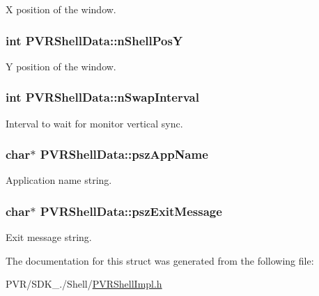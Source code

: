 X position of the window. \hypertarget{struct_p_v_r_shell_data_af3e9b9c86bef2d83b1c3b4edfacbb7f9}{
\subsubsection[{n\+Shell\+Pos\+Y}]{\setlength{\rightskip}{0pt plus 5cm}int P\+V\+R\+Shell\+Data\+::n\+Shell\+Pos\+Y}}\label{struct_p_v_r_shell_data_af3e9b9c86bef2d83b1c3b4edfacbb7f9}
Y position of the window. \hypertarget{struct_p_v_r_shell_data_a9584c6b96d5a88d83e1055f9f09d2f3f}{
\subsubsection[{n\+Swap\+Interval}]{\setlength{\rightskip}{0pt plus 5cm}int P\+V\+R\+Shell\+Data\+::n\+Swap\+Interval}}\label{struct_p_v_r_shell_data_a9584c6b96d5a88d83e1055f9f09d2f3f}
Interval to wait for monitor vertical sync. \hypertarget{struct_p_v_r_shell_data_ad2f1bea5e6431c6e0ea5e911404187aa}{
\subsubsection[{psz\+App\+Name}]{\setlength{\rightskip}{0pt plus 5cm}char$\ast$ P\+V\+R\+Shell\+Data\+::psz\+App\+Name}}\label{struct_p_v_r_shell_data_ad2f1bea5e6431c6e0ea5e911404187aa}
Application name string. \hypertarget{struct_p_v_r_shell_data_a9fe9e0aa9936fce1a0b1fa1e6f53ee84}{
\subsubsection[{psz\+Exit\+Message}]{\setlength{\rightskip}{0pt plus 5cm}char$\ast$ P\+V\+R\+Shell\+Data\+::psz\+Exit\+Message}}\label{struct_p_v_r_shell_data_a9fe9e0aa9936fce1a0b1fa1e6f53ee84}
Exit message string. 

The documentation for this struct was generated from the following file\+:\begin{DoxyCompactItemize}
\item 
P\+V\+R/\+S\+D\+K\+\_./\+Shell/\hyperlink{_p_v_r_shell_impl_8h}{P\+V\+R\+Shell\+Impl.\+h}\end{DoxyCompactItemize}
